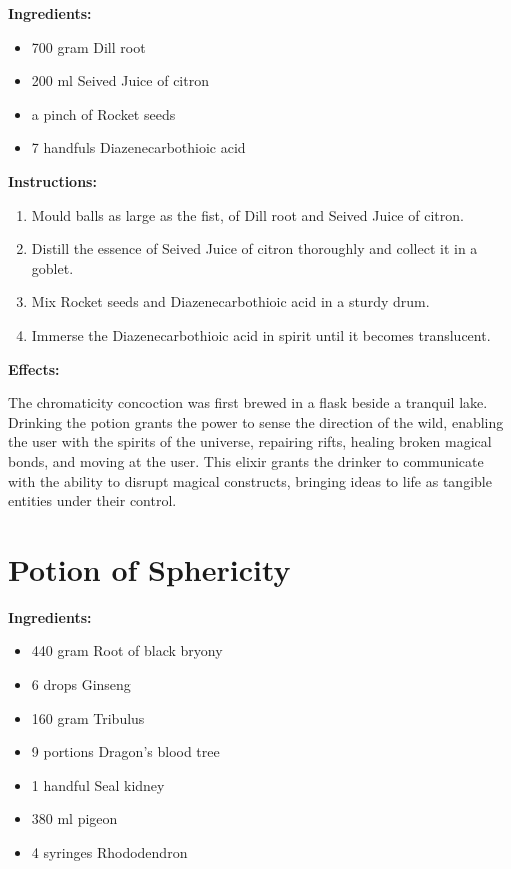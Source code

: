 \documentclass{article}
\begin{document}
\textbf{Ingredients:}

\begin{itemize}
  \item 700 gram Dill root
  \item 200 ml Seived Juice of citron
  \item a pinch of Rocket seeds
  \item 7 handfuls Diazenecarbothioic acid
\end{itemize}

\textbf{Instructions:}

\begin{enumerate}
  \item Mould balls as large as the fist, of Dill root and Seived Juice of citron.
  \item Distill the essence of Seived Juice of citron thoroughly and collect it in a goblet.
  \item Mix Rocket seeds and Diazenecarbothioic acid in a sturdy drum.
  \item Immerse the Diazenecarbothioic acid in spirit until it becomes translucent.
\end{enumerate}

\textbf{Effects:}

The chromaticity concoction was first brewed in a flask beside a tranquil lake. Drinking the potion grants the power to sense the direction of the wild, enabling the user with the spirits of the universe, repairing rifts, healing broken magical bonds, and moving at the user. This elixir grants the drinker to communicate with the ability to disrupt magical constructs, bringing ideas to life as tangible entities under their control.

\newpage
\section*{Potion of Sphericity}

\textbf{Ingredients:}

\begin{itemize}
  \item 440 gram Root of black bryony
  \item 6 drops Ginseng
  \item 160 gram Tribulus
  \item 9 portions Dragon's blood tree
  \item 1 handful Seal kidney
  \item 380 ml pigeon
  \item 4 syringes Rhododendron
\end{itemize}
\end{document}
